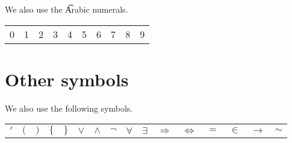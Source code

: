 We also use the \t{Arabic numerals}.
\begin{center}
\vspace{0.3cm}
\begin{tabular}{cccccccccc}
0 & 1 & 2 & 3 & 4 & 5 & 6 & 7 & 8 & 9\\
\end{tabular}
\vspace{0.1cm}

\end{center}

\section*{Other symbols}

We also use the following symbols.
\begin{center}
\vspace{0.3cm}
\begin{tabular}{cccccccccccccccc}
$'$ & $($ & $)$ & $\{$ & $\}$ & $\lor$ & $\land$ & $\neg$ & $\forall$ & $\exists $ & $\Rightarrow$ & $\iff$ & $=$ & $\in$ & $\to$ & $\sim$\\
\end{tabular}
\vspace{0.1cm}

%   
\end{center}
